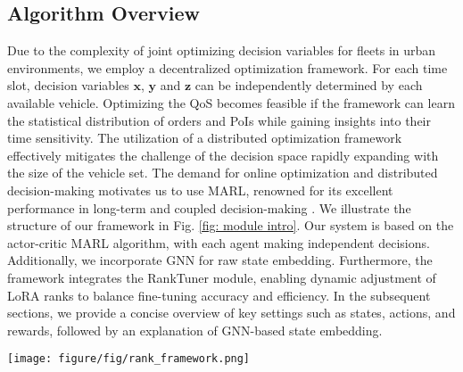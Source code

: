 \subsection{Algorithm Overview}
Due to the complexity of joint optimizing decision variables for fleets in urban environments, we employ a decentralized optimization framework. For each time slot, decision variables $\textbf{x}$, $\textbf{y}$ and $\textbf{z}$ can be independently determined by each available vehicle. Optimizing the QoS becomes feasible if the framework can learn the statistical distribution of orders and PoIs while gaining insights into their time sensitivity. The utilization of a distributed optimization framework effectively mitigates the challenge of the decision space rapidly expanding with the size of the vehicle set. The demand for online optimization and distributed decision-making motivates us to use MARL, renowned for its excellent performance in long-term and coupled decision-making \cite{why_use_MARL}. We illustrate the structure of our framework in Fig. \ref{fig: module intro}. Our system is based on the actor-critic MARL algorithm, with each agent making independent decisions. Additionally, we incorporate GNN for raw state embedding. 
Furthermore, the framework integrates the RankTuner module, enabling dynamic adjustment of LoRA ranks to balance fine-tuning accuracy and efficiency. 
In the subsequent sections, we provide a concise overview of key settings such as states, actions, and rewards, followed by an explanation of GNN-based state embedding. 
\begin{figure*}[t]
\centerline{\texttt{[image: figure/fig/rank\_framework.png]}}
\caption{GNN-based MARL framework. It includes the environment, a GNN embedding module for processing raw state information, an actor-critic module for decision-making, a replay buffer for experience storage, and the RankTuner module for dynamically adjusting LoRA ranks to balance fine-tuning accuracy and efficiency. These components work together to enable agents to make independent, informed decisions while optimizing their actions based on the dynamic environment.
}
\label{fig: module intro}
\end{figure*}
